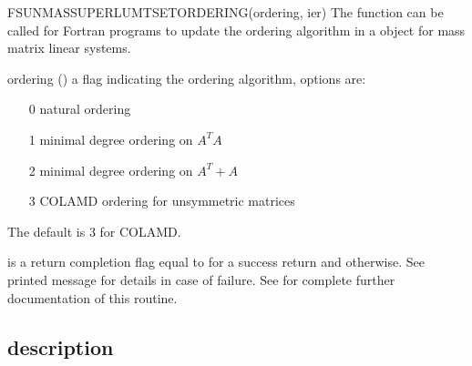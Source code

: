 {
  FSUNMASSUPERLUMTSETORDERING(ordering, ier)
}
{
  The function  can be called for Fortran
  programs to update the ordering algorithm in a {\sunlinsolslumt}
  object for mass matrix linear systems.
}
{
  \begin{args}[ordering]
  \item[ordering] ()
    a flag indicating the ordering algorithm, options are:
    \begin{itemize}
    \item[0] natural ordering
    \item[1] minimal degree ordering on $A^TA$
    \item[2] minimal degree ordering on $A^T+A$
    \item[3] COLAMD ordering for unsymmetric matrices
    \end{itemize}
    The default is 3 for COLAMD.
  \end{args}
}
{
   is a  return completion flag equal to  for a success
  return and  otherwise. See printed message for details in case
  of failure.
}
{
  See  for complete further
  documentation of this routine. 
}



\subsection{{\sunlinsolslumt} description}\label{ss:sunlinsol_slumt_description}



